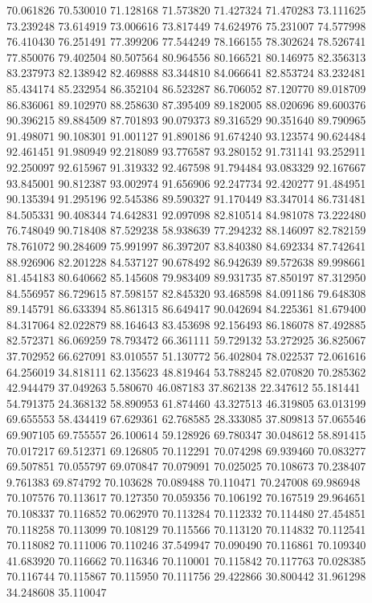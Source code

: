 70.061826
70.530010
71.128168
71.573820
71.427324
71.470283
73.111625
73.239248
73.614919
73.006616
73.817449
74.624976
75.231007
74.577998
76.410430
76.251491
77.399206
77.544249
78.166155
78.302624
78.526741
77.850076
79.402504
80.507564
80.964556
80.166521
80.146975
82.356313
83.237973
82.138942
82.469888
83.344810
84.066641
82.853724
83.232481
85.434174
85.232954
86.352104
86.523287
86.706052
87.120770
89.018709
86.836061
89.102970
88.258630
87.395409
89.182005
88.020696
89.600376
90.396215
89.884509
87.701893
90.079373
89.316529
90.351640
89.790965
91.498071
90.108301
91.001127
91.890186
91.674240
93.123574
90.624484
92.461451
91.980949
92.218089
93.776587
93.280152
91.731141
93.252911
92.250097
92.615967
91.319332
92.467598
91.794484
93.083329
92.167667
93.845001
90.812387
93.002974
91.656906
92.247734
92.420277
91.484951
90.135394
91.295196
92.545386
89.590327
91.170449
83.347014
86.731481
84.505331
90.408344
74.642831
92.097098
82.810514
84.981078
73.222480
76.748049
90.718408
87.529238
58.938639
77.294232
88.146097
82.782159
78.761072
90.284609
75.991997
86.397207
83.840380
84.692334
87.742641
88.926906
82.201228
84.537127
90.678492
86.942639
89.572638
89.998661
81.454183
80.640662
85.145608
79.983409
89.931735
87.850197
87.312950
84.556957
86.729615
87.598157
82.845320
93.468598
84.091186
79.648308
89.145791
86.633394
85.861315
86.649417
90.042694
84.225361
81.679400
84.317064
82.022879
88.164643
83.453698
92.156493
86.186078
87.492885
82.572371
86.069259
78.793472
66.361111
59.729132
53.272925
36.825067
37.702952
66.627091
83.010557
51.130772
56.402804
78.022537
72.061616
64.256019
34.818111
62.135623
48.819464
53.788245
82.070820
70.285362
42.944479
37.049263
5.580670
46.087183
37.862138
22.347612
55.181441
54.791375
24.368132
58.890953
61.874460
43.327513
46.319805
63.013199
69.655553
58.434419
67.629361
62.768585
28.333085
37.809813
57.065546
69.907105
69.755557
26.100614
59.128926
69.780347
30.048612
58.891415
70.017217
69.512371
69.126805
70.112291
70.074298
69.939460
70.083277
69.507851
70.055797
69.070847
70.079091
70.025025
70.108673
70.238407
9.761383
69.874792
70.103628
70.089488
70.110471
70.247008
69.986948
70.107576
70.113617
70.127350
70.059356
70.106192
70.167519
29.964651
70.108337
70.116852
70.062970
70.113284
70.112332
70.114480
27.454851
70.118258
70.113099
70.108129
70.115566
70.113120
70.114832
70.112541
70.118082
70.111006
70.110246
37.549947
70.090490
70.116861
70.109340
41.683920
70.116662
70.116346
70.110001
70.115842
70.117763
70.028385
70.116744
70.115867
70.115950
70.111756
29.422866
30.800442
31.961298
34.248608
35.110047
